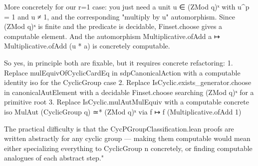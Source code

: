  More concretely for our r=1 case: you just need a unit u ∈ (ZMod q)ˣ with u^p = 1 and u ≠ 1, and the corresponding "multiply by u" automorphism. Since (ZMod q)ˣ is finite and the predicate is decidable,
  Finset.choose gives a computable element. And the automorphism Multiplicative.ofAdd a ↦ Multiplicative.ofAdd (u * a) is concretely computable.

  So yes, in principle both are fixable, but it requires concrete refactoring:
  1. Replace mulEquivOfCyclicCardEq in sdpCanonicalAction with a computable identity iso for the CyclicGroup case
  2. Replace IsCyclic.exists_generator.choose in canonicalAutElement with a decidable Finset.choose searching (ZMod q)ˣ for a primitive root
  3. Replace IsCyclic.mulAutMulEquiv with a computable concrete iso MulAut (CyclicGroup q) ≃* (ZMod q)ˣ via f ↦ f (Multiplicative.ofAdd 1)
  
  The practical difficulty is that the CycPGroupClassification.lean proofs are written abstractly for any cyclic group — making them computable would mean either specializing everything to CyclicGroup n
  concretely, or finding computable analogues of each abstract step."